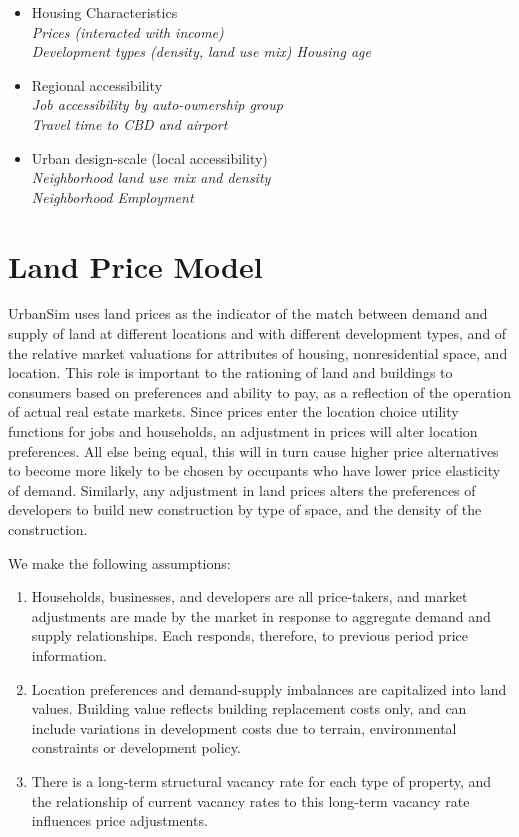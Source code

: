 \begin{itemize}

\item{Housing Characteristics} \\
\emph{Prices (interacted with income) \\
Development types (density, land use mix) Housing age}

\item{Regional accessibility} \\
\emph{Job accessibility by auto-ownership group \\
Travel time to CBD and airport}

\item{Urban design-scale (local accessibility) \\
\emph{Neighborhood land use mix and density \\
Neighborhood Employment}}

\end{itemize}

\section{Land Price Model}

UrbanSim uses land prices as the indicator of the match between
demand and supply of land at different locations and with
different development types, and of the relative market valuations
for attributes of housing, nonresidential space, and location.
This role is important to the rationing of land and buildings to
consumers based on preferences and ability to pay, as a reflection
of the operation of actual real estate markets. Since prices enter
the location choice utility functions for jobs and households, an
adjustment in prices will alter location preferences.  All else
being equal, this will in turn cause higher price alternatives to
become more likely to be chosen by occupants who have lower price
elasticity of demand. Similarly, any adjustment in land prices
alters the preferences of developers to build new construction by
type of space, and the density of the construction.

We make the following assumptions:

\begin{enumerate}
\item Households, businesses, and developers are all
price-takers, and market adjustments are made by the market in
response to aggregate demand and supply relationships.  Each
responds, therefore, to previous period price information. \item
Location preferences and demand-supply imbalances are capitalized
into land values.  Building value reflects building replacement
costs only, and can include variations in development costs due to
terrain, environmental constraints or development policy. \item
There is a long-term structural vacancy rate for each type of
property, and the relationship of current vacancy rates to this
long-term vacancy rate influences price adjustments.
\end{enumerate}

